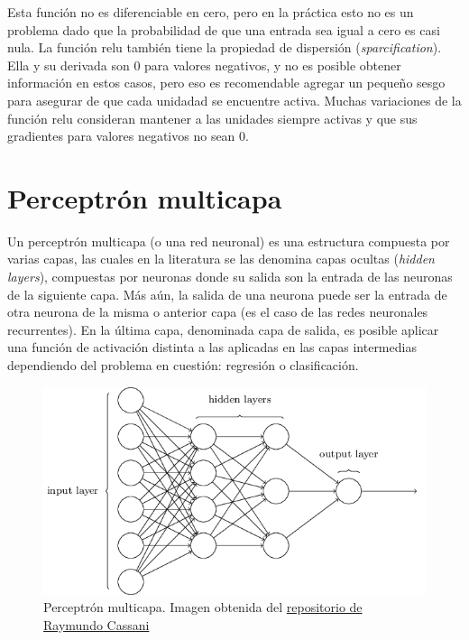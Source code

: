 \indent Esta función no es diferenciable en cero, pero en la práctica esto no es un problema dado que la
probabilidad de que una entrada sea igual a cero es casi nula. La función \acrshort{relu} también tiene la propiedad
de dispersión (\textit{sparcification}). Ella y su derivada son 0 para valores negativos, y no es posible obtener
información en estos casos, pero eso es recomendable agregar un pequeño sesgo para asegurar de que cada unidadad se
encuentre activa. Muchas variaciones de la función \acrshort{relu} consideran mantener a las unidades siempre
activas y que sus gradientes para valores negativos no sean 0.

\section{Perceptrón multicapa}

\indent Un perceptrón multicapa (o una red neuronal) es una estructura compuesta por varias capas, las cuales en la
literatura se las denomina capas ocultas (\textit{hidden layers}), compuestas por neuronas donde su salida son la
entrada de las neuronas de la siguiente capa. Más aún, la salida de una neurona puede ser la entrada de otra neurona
de la misma o anterior capa (es el caso de las redes neuronales recurrentes). En la última capa, denominada capa de
salida, es posible aplicar una función de activación distinta a las aplicadas en las capas intermedias dependiendo
del problema en cuestión: regresión o clasificación.

\begin{figure}[H]
  \centering
  \includegraphics[scale=0.6]{chapters/chapter-06/images/mlp-network.png}
  \caption[Perceptrón multicapa]{Perceptrón multicapa. Imagen obtenida del \href{https://github
  .com/rcassani/mlp-example}{repositorio de Raymundo Cassani}}
  \label{fig:mlp_net}
\end{figure}

